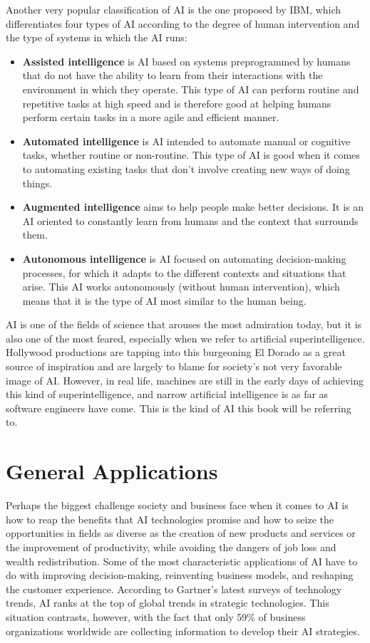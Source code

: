 \documentclass[
  letterpaper,
  DIV=11,
  numbers=noendperiod]{scrreprt}
\begin{document}
Another very popular classification of AI is the one proposed by IBM,
which differentiates four types of AI according to the degree of human
intervention and the type of systems in which the AI runs:

\begin{itemize}
\item
  \textbf{Assisted intelligence} is AI based on systems preprogrammed by
  humans that do not have the ability to learn from their interactions
  with the environment in which they operate. This type of AI can
  perform routine and repetitive tasks at high speed and is therefore
  good at helping humans perform certain tasks in a more agile and
  efficient manner.
\item
  \textbf{Automated intelligence} is AI intended to automate manual or
  cognitive tasks, whether routine or non-routine. This type of AI is
  good when it comes to automating existing tasks that don't involve
  creating new ways of doing things.
\item
  \textbf{Augmented intelligence} aims to help people make better
  decisions. It is an AI oriented to constantly learn from humans and
  the context that surrounds them.
\item
  \textbf{Autonomous intelligence} is AI focused on automating
  decision-making processes, for which it adapts to the different
  contexts and situations that arise. This AI works autonomously
  (without human intervention), which means that it is the type of AI
  most similar to the human being.
\end{itemize}

AI is one of the fields of science that arouses the most admiration
today, but it is also one of the most feared, especially when we refer
to artificial superintelligence. Hollywood productions are tapping into
this burgeoning El Dorado as a great source of inspiration and are
largely to blame for society's not very favorable image of AI. However,
in real life, machines are still in the early days of achieving this
kind of superintelligence, and narrow artificial intelligence is as far
as software engineers have come. This is the kind of AI this book will
be referring to.

\hypertarget{general-applications}{%
\section{General Applications}\label{general-applications}}

Perhaps the biggest challenge society and business face when it comes to
AI is how to reap the benefits that AI technologies promise and how to
seize the opportunities in fields as diverse as the creation of new
products and services or the improvement of productivity, while avoiding
the dangers of job loss and wealth redistribution. Some of the most
characteristic applications of AI have to do with improving
decision-making, reinventing business models, and reshaping the customer
experience. According to Gartner's latest surveys of technology trends,
AI ranks at the top of global trends in strategic technologies. This
situation contrasts, however, with the fact that only 59\% of business
organizations worldwide are collecting information to develop their AI
strategies.
\end{document}
